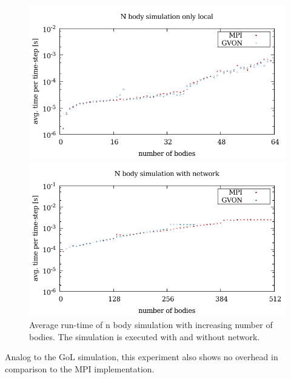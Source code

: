 \begin{figure}[H]
  \begin{minipage}[t]{0.5\textwidth}
    \includegraphics[width=\textwidth]{plots/50_nbody_laser}
  \end{minipage}%
  \begin{minipage}[t]{0.5\textwidth}
    \includegraphics[width=\textwidth]{plots/50_nbody_network_laser}
  \end{minipage}%
  \label{fig:nbody_laser}
  \caption{Average run-time of n body simulation with increasing number
    of bodies. The simulation is executed with and without network.}
\end{figure}

Analog to the GoL simulation, this experiment also shows no overhead
in comparison to the MPI implementation.

